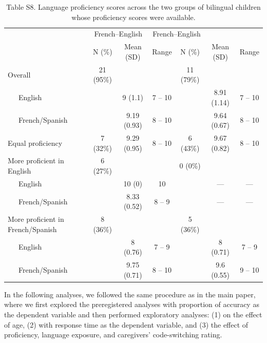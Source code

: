 \documentclass[
  man,floatsintext]{apa7}
\begin{document}
\begin{table}[H]

\begin{center}
\begin{threeparttable}

\caption{\label{tab:unnamed-chunk-23}Table S8. Language proficiency scores across the two groups of bilingual children whose proficiency scores were available. }

\begin{tabular}{lcccccc}
\toprule
 & \multicolumn{2}{c}{French–English} & \multicolumn{2}{c}{French–English} \\
\cmidrule(r){2-4} \cmidrule(r){5-7}
  & \multicolumn{1}{c}{N (\%)} & \multicolumn{1}{c}{Mean (SD)} & \multicolumn{1}{c}{Range} & \multicolumn{1}{c}{N (\%)} & \multicolumn{1}{c}{Mean (SD)} & \multicolumn{1}{c}{Range}\\
\midrule
Overall & 21 (95\%) &  &  & 11 (79\%) &  & \\
\ \ \  English &  & 9 (1.1) & 7 – 10 &  & 8.91 (1.14) & 7 – 10\\
\ \ \  French/Spanish &  & 9.19 (0.93) & 8 – 10 &  & 9.64 (0.67) & 8 – 10\\
Equal proficiency & 7 (32\%) & 9.29 (0.95) & 8 – 10 & 6 (43\%) & 9.67 (0.82) & 8 – 10\\
More proficient in English & 6 (27\%) &  &  & 0 (0\%) &  & \\
\ \ \  English &  & 10 (0) & 10 &  & — & —\\
\ \ \  French/Spanish &  & 8.33 (0.52) & 8 – 9 &  & — & —\\
More proficient in French/Spanish & 8 (36\%) &  &  & 5 (36\%) &  & \\
\ \ \  English &  & 8 (0.76) & 7 – 9 &  & 8 (0.71) & 7 – 9\\
\ \ \  French/Spanish &  & 9.75 (0.71) & 8 – 10 &  & 9.6 (0.55) & 9 – 10\\
\bottomrule
\end{tabular}

\end{threeparttable}
\end{center}

\end{table}

In the following analyses, we followed the same procedure as in the main paper, where we first explored the preregistered analyses with proportion of accuracy as the dependent variable and then performed exploratory analyses: (1) on the effect of age, (2) with response time as the dependent variable, and (3) the effect of proficiency, language exposure, and caregivers' code-switching rating.
\end{document}
